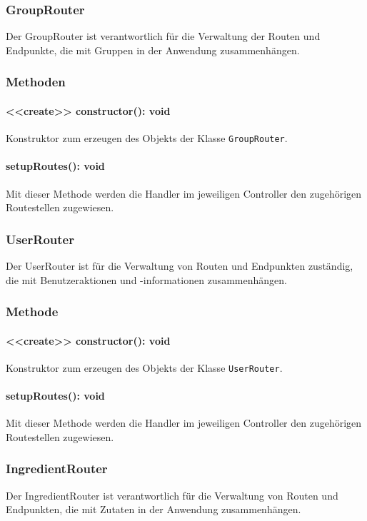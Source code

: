 \documentclass[parskip=full]{scrartcl}
\begin{document}
\subsubsection{GroupRouter}
Der GroupRouter ist verantwortlich für die Verwaltung der Routen und Endpunkte, die mit Gruppen in der Anwendung zusammenhängen.
\subsubsection*{Methoden}
\paragraph{<<create>> constructor(): void}Konstruktor zum erzeugen des Objekts der Klasse \newline
\texttt{GroupRouter}.
\paragraph{setupRoutes(): void}Mit dieser Methode werden die Handler im jeweiligen Controller den zugehörigen Routestellen zugewiesen.

\subsubsection{UserRouter}
Der UserRouter ist für die Verwaltung von Routen und Endpunkten zuständig, die mit Benutzeraktionen und -informationen zusammenhängen.
\subsubsection*{Methode}
\paragraph{<<create>> constructor(): void}Konstruktor zum erzeugen des Objekts der Klasse \texttt{UserRouter}.
\paragraph{setupRoutes(): void}Mit dieser Methode werden die Handler im jeweiligen Controller den zugehörigen Routestellen zugewiesen.

\subsubsection{IngredientRouter}
Der IngredientRouter ist verantwortlich für die Verwaltung von Routen und Endpunkten, die mit Zutaten in der Anwendung zusammenhängen.
\end{document}
